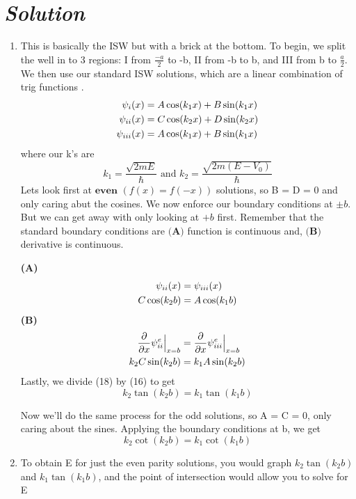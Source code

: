 \documentclass{article}
\newcommand{\RNum}[1]{\uppercase\expandafter{\romannumeral #1\relax}}
\begin{document}
\section*{\textit{Solution}} 
\begin{enumerate}[label=\alph*)]
	\item This is basically the ISW but with a brick at the bottom. To begin, we split the well in to 3 regions: I from $\frac{-a}{2}$ to -b, II from -b to b, and III from b to $\frac{a}{2}$. We then use our standard ISW solutions, which are a linear combination of trig functions	.	\begin{align}
		\psi_{\RNum{1}}(x) &= A\cos(k_{1}x) + B\sin(k_{1}x) \\ 
		\psi_{\RNum{2}}(x) &= C\cos(k_{2}x) + D\sin(k_{2}x) \\ 
		\psi_{\RNum{3}}(x) &= A\cos(k_{1}x) + B\sin(k_{1}x) 
	\end{align}
	where our k's are
	\[ k_1 = \frac{\sqrt{2mE}}{\hbar} \text{ and } k_2 = \frac{\sqrt{2m(E-V_0)}}{\hbar} \]
	Lets look first at $\textbf{even } (f(x) = f(-x))$ solutions, so B = D = 0 and only caring abut the cosines. We now enforce our boundary conditions at $\pm b$. But we can get away with only looking at $+b$ first. Remember that the standard boundary conditions are $\textbf{(A)}$ function is continuous and, $\textbf{(B)}$ derivative is continuous.
	
	 \textbf{(A)}
	\begin{align}
	\psi_{\RNum{2}}(x) &= \psi_{\RNum{3}}(x) \\ 
	C\cos(k_{2}b) &= A\cos(k_{1}b) 
	\end{align}
	 \textbf{(B)} \\
	\begin{align}
	\frac{ \partial }{\partial x} \psi^e_{\RNum{2}} \Bigr\rvert_{x = b} &= \frac{ \partial }{\partial x} \psi^e_{\RNum{3}} \Bigr\rvert_{x = b} \\ 
	k_2C\sin(k_2b) &= k_1A\sin(k_2b)
	\end{align}
	Lastly, we divide (18) by (16) to get 
	\[ \boxed{ k_2\tan(k_2b) = k_1\tan(k_1b) } \]
	
Now we'll do the same process for the odd solutions, so A = C = 0, only caring about the sines. Applying the boundary conditions at b, we get 
	\[ \boxed{ k_2\cot(k_2b) = k_1\cot(k_1b) } \]
	\item To obtain E for just the even parity solutions, you would graph $k_2\tan(k_2b)$ and  $k_1\tan(k_1b)$, and the point of intersection would allow you to solve for E
\end{enumerate}
\end{document}
